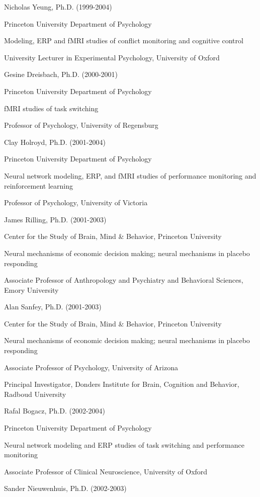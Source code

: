 \documentclass[10 pt]{article}
\begin{document}
Nicholas Yeung, Ph.D. (1999-2004)

Princeton University Department of Psychology

Modeling, ERP and fMRI studies of conflict monitoring and cognitive control

University Lecturer in Experimental Psychology, University of Oxford
    \medskip

Gesine Dreisbach, Ph.D. (2000-2001)

Princeton University Department of Psychology

fMRI studies of task switching

Professor of Psychology, University of Regensburg
    \medskip

Clay Holroyd, Ph.D. (2001-2004)

Princeton University Department of Psychology

Neural network modeling, ERP, and fMRI studies of performance monitoring and reinforcement learning

Professor of Psychology, University of Victoria
    \medskip

James Rilling, Ph.D. (2001-2003)

Center for the Study of Brain, Mind \& Behavior, Princeton University

Neural mechanisms of economic decision making; neural mechanisms in placebo responding

Associate Professor of Anthropology and Psychiatry and Behavioral Sciences, Emory University
    \medskip

Alan Sanfey, Ph.D. (2001-2003)

Center for the Study of Brain, Mind \& Behavior, Princeton University

Neural mechanisms of economic decision making; neural mechanisms in placebo responding

Associate Professor of Psychology, University of Arizona

Principal Investigator, Donders Institute for Brain, Cognition and Behavior, Radboud University
    \medskip

Rafal Bogacz, Ph.D. (2002-2004)

Princeton University Department of Psychology

Neural network modeling and ERP studies of task switching and performance monitoring

Associate Professor of Clinical Neuroscience, University of Oxford
    \medskip

Sander Nieuwenhuis, Ph.D. (2002-2003)
\end{document}
